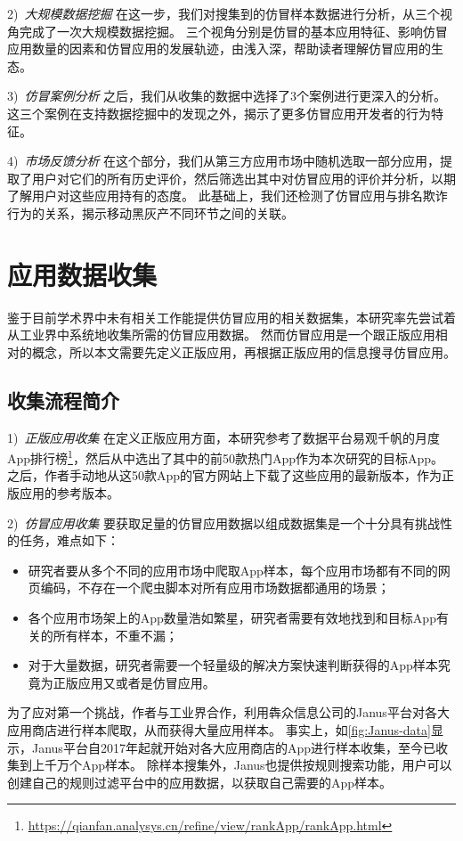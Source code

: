 2)\ \emph{大规模数据挖掘} \quad
在这一步，我们对搜集到的仿冒样本数据进行分析，从三个视角完成了一次大规模数据挖掘。
三个视角分别是仿冒的基本应用特征、影响仿冒应用数量的因素和仿冒应用的发展轨迹，由浅入深，帮助读者理解仿冒应用的生态。

3)\ \emph{仿冒案例分析} \quad
之后，我们从收集的数据中选择了3个案例进行更深入的分析。
这三个案例在支持数据挖掘中的发现之外，揭示了更多仿冒应用开发者的行为特征。

4)\ \emph{市场反馈分析} \quad
在这个部分，我们从第三方应用市场中随机选取一部分应用，提取了用户对它们的所有历史评价，然后筛选出其中对仿冒应用的评价并分析，以期了解用户对这些应用持有的态度。
此基础上，我们还检测了仿冒应用与排名欺诈行为的关系，揭示移动黑灰产不同环节之间的关联。

\section{应用数据收集}
鉴于目前学术界中未有相关工作能提供仿冒应用的相关数据集，本研究率先尝试着从工业界中系统地收集所需的仿冒应用数据。
然而仿冒应用是一个跟正版应用相对的概念，所以本文需要先定义正版应用，再根据正版应用的信息搜寻仿冒应用。

\subsection{收集流程简介}
1)\ \emph{正版应用收集} \quad
在定义正版应用方面，本研究参考了数据平台易观千帆的月度App排行榜\footnote{\url{https://qianfan.analysys.cn/refine/view/rankApp/rankApp.html}}，然后从中选出了其中的前50款热门App作为本次研究的目标App。
之后，作者手动地从这50款App的官方网站上下载了这些应用的最新版本，作为正版应用的参考版本。

2)\ \emph{仿冒应用收集} \quad
要获取足量的仿冒应用数据以组成数据集是一个十分具有挑战性的任务，难点如下：
\begin{itemize}
	\item 研究者要从多个不同的应用市场中爬取App样本，每个应用市场都有不同的网页编码，不存在一个爬虫脚本对所有应用市场数据都通用的场景；
	\item 各个应用市场架上的App数量浩如繁星，研究者需要有效地找到和目标App有关的所有样本，不重不漏；
	\item 对于大量数据，研究者需要一个轻量级的解决方案快速判断获得的App样本究竟为正版应用又或者是仿冒应用。
\end{itemize}

为了应对第一个挑战，作者与工业界合作，利用犇众信息公司的Janus平台对各大应用商店进行样本爬取，从而获得大量应用样本。
事实上，如\autoref{fig:Janus-data}显示，Janus平台自2017年起就开始对各大应用商店的App进行样本收集，至今已收集到上千万个App样本。
除样本搜集外，Janus也提供按规则搜索功能，用户可以创建自己的规则过滤平台中的应用数据，以获取自己需要的App样本。

